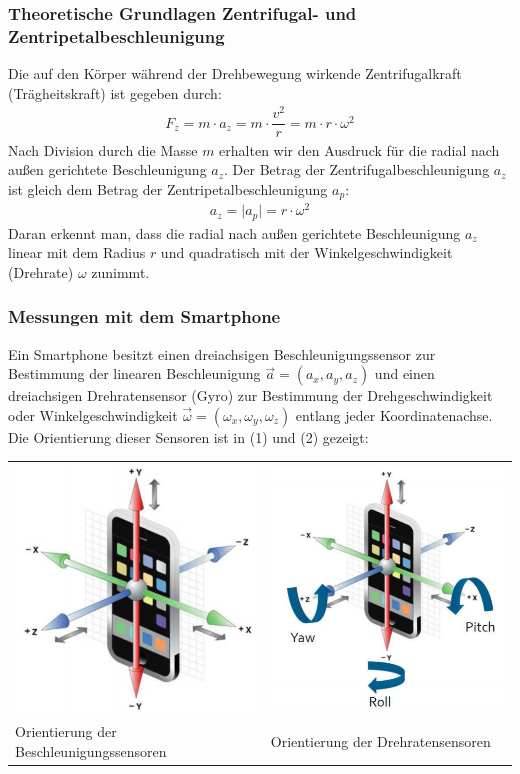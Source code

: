 \documentclass{beamer}
\begin{document}
\frame
{
  \frametitle{Theoretische Grundlagen Zentrifugal- und Zentripetalbeschleunigung}
Die auf den Körper während der Drehbewegung wirkende Zentrifugalkraft (Trägheitskraft) ist gegeben durch:
\begin{align}
F_z=m\cdot a_z=m\cdot\dfrac{v^{2}}{r}=m\cdot r\cdot \omega^{2}
\end{align}
Nach Division durch die Masse $m$ erhalten wir den Ausdruck für die radial nach außen gerichtete Beschleunigung $a_z$. Der Betrag der Zentrifugalbeschleunigung $a_z$ ist gleich dem Betrag der Zentripetalbeschleunigung $a_p$:
\begin{align}
a_z=\vert a_p\vert=r\cdot \omega^{2}
\end{align}
Daran erkennt man, dass die radial nach außen gerichtete Beschleunigung $a_z$ linear mit dem Radius $r$ und quadratisch mit der Winkelgeschwindigkeit (Drehrate) $\omega$ zunimmt.
}

\frame
{
\frametitle{Messungen mit dem Smartphone}

Ein Smartphone besitzt einen dreiachsigen Beschleunigungssensor zur Bestimmung der linearen Beschleunigung $\overrightarrow{a}=(a_{x},a_{y},a_{z})$ und einen dreiachsigen Drehratensensor (Gyro) zur Bestimmung der Drehgeschwindigkeit oder Winkelgeschwindigkeit $\overrightarrow{\omega}=(\omega_{x},\omega_{y},\omega_{z})$ entlang jeder Koordinatenachse. Die Orientierung dieser Sensoren ist in (1) und (2) gezeigt:

\begin{tabular}{@{} *{2}{C{.5\linewidth}} }
  \includegraphics[width=.45\linewidth]{Smartphone_1.png} &
    \includegraphics[width=.45\linewidth]{Smartphone_2.png} \\[\abovecaptionskip]
  Orientierung der Beschleunigungssensoren & Orientierung der Drehratensensoren
\end{tabular}
}
\end{document}
